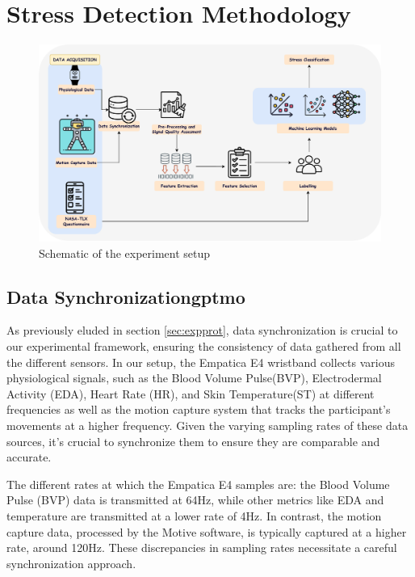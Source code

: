 \chapter{Stress Detection Methodology}


\begin{figure}[h]
	\centering
	\includegraphics[width=\columnwidth]{images/schematic.pdf}
	\caption{Schematic of the experiment setup}
	\label{fig:netwrok}
\end{figure}

\section{Data Synchronization\gls*{gptmo}} \label{sec:synchronization} 
As previously eluded in section \ref{sec:expprot}, data synchronization is crucial to our experimental framework, ensuring the consistency
of data gathered from all the different sensors. In our setup, the Empatica E4 wristband collects various physiological signals, such as the Blood Volume Pulse(BVP), Electrodermal Activity (EDA), Heart Rate (HR), and Skin Temperature(ST) at different frequencies as well as the motion capture system that tracks the participant's movements at a higher frequency. Given the varying sampling rates of these data sources, it's crucial to synchronize them to ensure they are comparable and accurate.

The different rates at which the Empatica E4 samples are: the Blood Volume Pulse (BVP) data is transmitted at 64Hz, while other metrics like EDA and temperature are transmitted at a lower rate of 4Hz. In contrast, the motion capture data, processed by the Motive software, is typically captured at a higher rate, around 120Hz. These discrepancies in sampling rates necessitate a careful synchronization approach.


